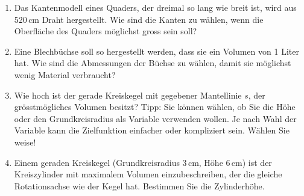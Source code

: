 \begin{ueb}
\begin{enumerate}
\begin{center}
\begin{tikzpicture}[scale=0.12]
			      \end{tikzpicture}
		      \end{center}
		\item Das Kantenmodell eines Quaders, der dreimal so lang wie breit ist, wird aus 520\,cm Draht hergestellt. Wie sind die Kanten zu wählen, wenn die Oberfläche des Quaders möglichst gross sein soll?
		\item Eine Blechbüchse soll so hergestellt werden, dass sie ein Volumen von 1 Liter hat. Wie sind die Abmessungen der Büchse zu wählen, damit sie möglichst wenig Material verbraucht?
		\item Wie hoch ist der gerade Kreiskegel mit gegebener Mantellinie \(s\), der grösstmögliches Volumen besitzt? Tipp: Sie können wählen, ob Sie die Höhe oder den Grundkreisradius als Variable verwenden wollen. Je nach Wahl der Variable kann die Zielfunktion einfacher oder kompliziert sein. Wählen Sie weise!
		\item Einem geraden Kreiskegel (Grundkreisradius \(3\,\text{cm}\), Höhe \(6\,\text{cm}\)) ist der Kreiszylinder mit maximalem Volumen einzubeschreiben, der die gleiche Rotationsachse wie der Kegel hat. Bestimmen Sie die Zylinderhöhe.
		      \setcounter{temp}{\value{enumi}}
	\end{enumerate}
\end{ueb}

